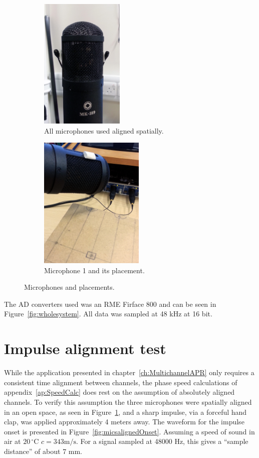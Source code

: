 \begin{figure}
\centering
\begin{subfigure}{.5\textwidth}
  \centering
  \includegraphics[width=4cm]{micsAlign}%
  \caption{All microphones used aligned spatially.}
  \label{fig:micsaligned}
\end{subfigure}%
\begin{subfigure}{.5\textwidth}
  \centering
  \includegraphics[width=5cm]{mic1}%
  \caption{Microphone 1 and its placement.}
  \label{fig:mic1}
\end{subfigure}
\caption{Microphones and placements.}
\label{fig:mic123}
\end{figure}

The AD converters used was an RME Firface 800 and can be seen in Figure~\ref{fig:wholesystem}. All data was sampled at 48 kHz at 16 bit.

\section{Impulse alignment test}\label{sec:MultiAPRsystemAligntest}
While the application presented in chapter~\ref{ch:MultichannelAPR} only requires a consistent time alignment between channels, the phase speed calculations of appendix~\ref{ap:SpeedCalc} does rest on the assumption of absolutely aligned channels. To verify this assumption the three microphones were spatially aligned in an open space, as seen in Figure~\ref{fig:micsaligned}, and a sharp impulse, via a forceful hand clap, was applied approximately 4 meters away. The waveform for the impulse onset is presented in Figure~\ref{fig:micsalignedOnset}. Assuming a speed of sound in air at $20\,^{\circ}\mathrm{C}$ $c = 343 \mathrm{m}/\mathrm{s}$. For a signal sampled at 48000 Hz, this gives a ``sample distance'' of about 7 mm. 

